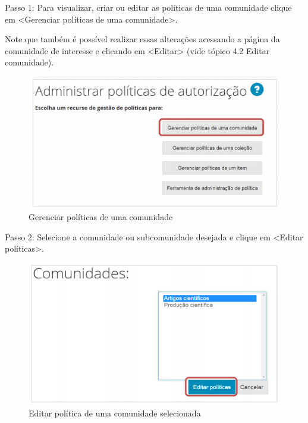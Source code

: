 \documentclass[12pt,hidelinks]{article}
\begin{document}
    Passo 1: Para visualizar, criar ou editar as políticas de uma comunidade clique em <Gerenciar políticas de uma comunidade>.

\newpage

    Note que também é possível realizar essas alterações acessando a página da comunidade de interesse e clicando em <Editar> (vide tópico 4.2 Editar comunidade).
    
    \begin{figure}[!htp]
                \centering
                \includegraphics[scale=0.7]{figura/Figura73.png}
                \caption{Gerenciar políticas de uma comunidade}
            \label{Rotulo}
        \end{figure}
    
    Passo 2: Selecione a comunidade ou subcomunidade desejada e clique em <Editar políticas>.
    
    \begin{figure}[!htp]
                \centering
                \includegraphics[scale=0.8]{figura/Figura74.png}
                \caption{Editar política de uma comunidade selecionada}
            \label{Rotulo}
        \end{figure}
    
\end{document}

